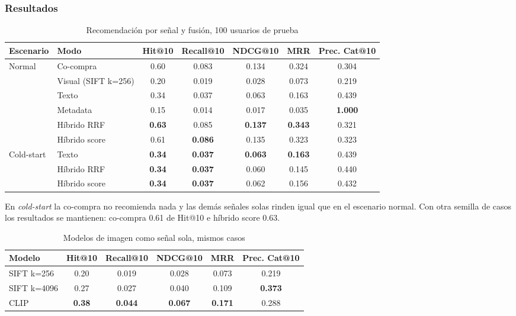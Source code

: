 \subsubsection{Resultados}
\begin{table}[H]
\centering\small
\caption{Recomendación por señal y fusión, 100 usuarios de prueba}
\begin{tabular}{llccccc}
\toprule
Escenario & Modo & Hit@10 & Recall@10 & NDCG@10 & MRR & Prec. Cat@10 \\
\midrule
Normal & Co-compra & 0.60 & 0.083 & 0.134 & 0.324 & 0.304 \\
 & Visual (SIFT k=256) & 0.20 & 0.019 & 0.028 & 0.073 & 0.219 \\
 & Texto & 0.34 & 0.037 & 0.063 & 0.163 & 0.439 \\
 & Metadata & 0.15 & 0.014 & 0.017 & 0.035 & \textbf{1.000} \\
 & Híbrido RRF & \textbf{0.63} & 0.085 & \textbf{0.137} & \textbf{0.343} & 0.321 \\
 & Híbrido score & 0.61 & \textbf{0.086} & 0.135 & 0.323 & 0.323 \\
\midrule
Cold-start & Texto & \textbf{0.34} & \textbf{0.037} & \textbf{0.063} & \textbf{0.163} & 0.439 \\
 & Híbrido RRF & \textbf{0.34} & \textbf{0.037} & 0.060 & 0.145 & 0.440 \\
 & Híbrido score & \textbf{0.34} & \textbf{0.037} & 0.062 & 0.156 & 0.432 \\
\bottomrule
\end{tabular}
\end{table}
En \emph{cold-start} la co-compra no recomienda nada y las demás señales solas rinden igual que en el escenario normal. Con otra semilla de casos los resultados se mantienen: co-compra 0.61 de Hit@10 e híbrido score 0.63.

\begin{table}[H]
\centering\small
\caption{Modelos de imagen como señal sola, mismos casos}
\begin{tabular}{lccccc}
\toprule
Modelo & Hit@10 & Recall@10 & NDCG@10 & MRR & Prec. Cat@10 \\
\midrule
SIFT k=256 & 0.20 & 0.019 & 0.028 & 0.073 & 0.219 \\
SIFT k=4096 & 0.27 & 0.027 & 0.040 & 0.109 & \textbf{0.373} \\
CLIP & \textbf{0.38} & \textbf{0.044} & \textbf{0.067} & \textbf{0.171} & 0.288 \\
\bottomrule
\end{tabular}
\end{table}

